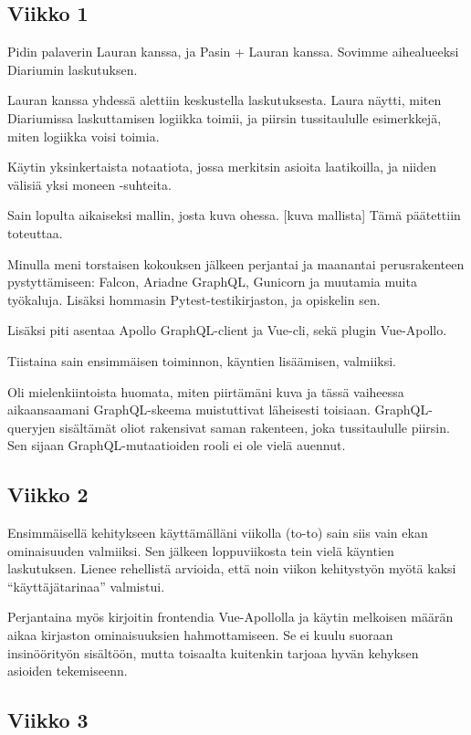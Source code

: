 \hypertarget{viikko-1}{%
\subsection{Viikko 1}\label{viikko-1}}

Pidin palaverin Lauran kanssa, ja Pasin + Lauran kanssa. Sovimme
aihealueeksi Diariumin laskutuksen.

Lauran kanssa yhdessä alettiin keskustella laskutuksesta. Laura näytti,
miten Diariumissa laskuttamisen logiikka toimii, ja piirsin
tussitaululle esimerkkejä, miten logiikka voisi toimia.

Käytin yksinkertaista notaatiota, jossa merkitsin asioita laatikoilla,
ja niiden välisiä yksi moneen -suhteita.

Sain lopulta aikaiseksi mallin, josta kuva ohessa. {[}kuva mallista{]}
Tämä päätettiin toteuttaa.

Minulla meni torstaisen kokouksen jälkeen perjantai ja maanantai
perusrakenteen pystyttämiseen: Falcon, Ariadne GraphQL, Gunicorn ja
muutamia muita työkaluja. Lisäksi hommasin Pytest-testikirjaston, ja
opiskelin sen.

Lisäksi piti asentaa Apollo GraphQL-client ja Vue-cli, sekä plugin
Vue-Apollo.

Tiistaina sain ensimmäisen toiminnon, käyntien lisäämisen, valmiiksi.

Oli mielenkiintoista huomata, miten piirtämäni kuva ja tässä vaiheessa
aikaansaamani GraphQL-skeema muistuttivat läheisesti toisiaan.
GraphQL-queryjen sisältämät oliot rakensivat saman rakenteen, joka
tussitaululle piirsin. Sen sijaan GraphQL-mutaatioiden rooli ei ole
vielä auennut.

\hypertarget{viikko-2}{%
\subsection{Viikko 2}\label{viikko-2}}

Ensimmäisellä kehitykseen käyttämälläni viikolla (to-to) sain siis vain
ekan ominaisuuden valmiiksi. Sen jälkeen loppuviikosta tein vielä
käyntien laskutuksen. Lienee rehellistä arvioida, että noin viikon
kehitystyön myötä kaksi ``käyttäjätarinaa'' valmistui.

Perjantaina myös kirjoitin frontendia Vue-Apollolla ja käytin melkoisen
määrän aikaa kirjaston ominaisuuksien hahmottamiseen. Se ei kuulu
suoraan insinöörityön sisältöön, mutta toisaalta kuitenkin tarjoaa hyvän
kehyksen asioiden tekemiseenn.

\hypertarget{viikko-3}{%
\subsection{Viikko 3}\label{viikko-3}}

